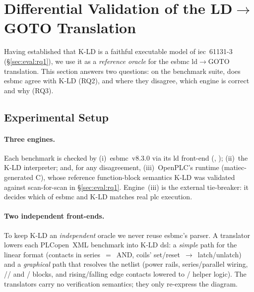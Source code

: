 \providecommand{\kld}{\textsc{K-LD}}
\providecommand{\openplc}{OpenPLC}
\providecommand{\cmark}{\ensuremath{\checkmark}}      %
\providecommand{\xmark}{\ensuremath{\boldsymbol{\times}}}

\section{Differential Validation of the LD\texorpdfstring{$\rightarrow$}{->}GOTO Translation}
\label{sec:e3}

Having established that \kld{} is a faithful executable model of \gls{iec}~61131-3
(\S\ref{sec:eval:rq1}), we use it as a \emph{reference oracle} for the \gls{esbmc}
\gls{ld}$\rightarrow$GOTO translation. This section answers two questions: on the
benchmark suite, does \gls{esbmc} agree with \kld{} (RQ2), and where they disagree,
which engine is correct and why (RQ3).

\subsection{Experimental Setup}
\label{sec:e3:setup}

\paragraph{Three engines.} Each benchmark is checked by (i)~\gls{esbmc}~v8.3.0 via its
\gls{ld} front-end (, );
(ii)~the \kld{} interpreter; and, for any disagreement, (iii)~\openplc{}'s runtime
(\gls{matiec}-generated C), whose reference function-block semantics \kld{} was
validated against scan-for-scan in \S\ref{sec:eval:rq1}. Engine~(iii) is the external
tie-breaker: it decides which of \gls{esbmc} and \kld{} matches real \gls{plc}
execution.

\paragraph{Two independent front-ends.} To keep \kld{} an \emph{independent} oracle we
never reuse \gls{esbmc}'s parser. A translator lowers each PLCopen~XML benchmark into
\kld{} \gls{dsl}: a \emph{simple} path for the linear  format (contacts in
series~$=$~AND, coils'  set/reset~$\rightarrow$~latch/unlatch) and a
\emph{graphical} path that resolves the netlist (power rails, series/parallel wiring,
// and / blocks, and rising/falling
edge contacts lowered to / helper logic). The translators
carry no verification semantics; they only re-express the diagram.

